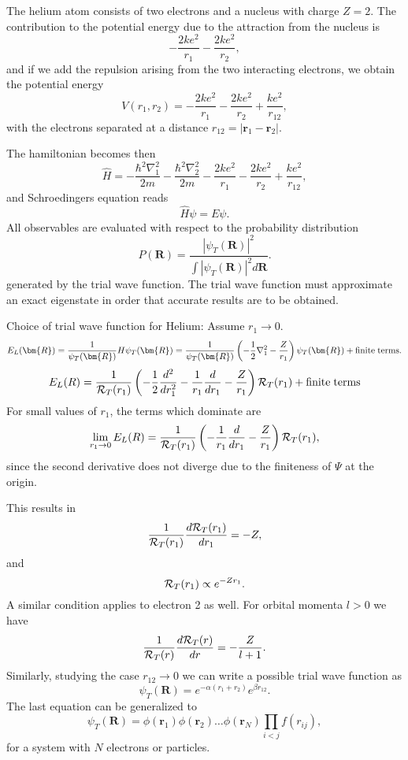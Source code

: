 \documentclass[graybox,sectrefs,envcountresetchap,open=right]{svmonodo}
\begin{document}
The helium atom consists of two electrons and a nucleus with
charge $Z=2$. 
The contribution  
to the potential energy due to the attraction from the nucleus is
\[
   -\frac{2ke^2}{r_1}-\frac{2ke^2}{r_2},
\] 
and if we add the repulsion arising from the two 
interacting electrons, we obtain the potential energy
\[
 V(r_1, r_2)=-\frac{2ke^2}{r_1}-\frac{2ke^2}{r_2}+
               \frac{ke^2}{r_{12}},
\]
with the electrons separated at a distance 
$r_{12}=|\bm{r}_1-\bm{r}_2|$.






The hamiltonian becomes then
\[
   \hat{H}=-\frac{\hbar^2\nabla_1^2}{2m}-\frac{\hbar^2\nabla_2^2}{2m}
          -\frac{2ke^2}{r_1}-\frac{2ke^2}{r_2}+
               \frac{ke^2}{r_{12}},
\]
and  Schroedingers equation reads
\[
   \hat{H}\psi=E\psi.
\]
All observables are evaluated with respect to the probability distribution
\[
   P(\bm{R})= \frac{\left|\psi_T(\bm{R})\right|^2}{\int \left|\psi_T(\bm{R})\right|^2d\bm{R}}.
\]
generated by the trial wave function.   
The trial wave function must approximate an exact 
eigenstate in order that accurate results are to be obtained. 




Choice of trial wave function for Helium:
Assume $r_1 \rightarrow 0$.
\[
   E_L(\bm{R})=\frac{1}{\psi_T(\bm{R})}H\psi_T(\bm{R})=
     \frac{1}{\psi_T(\bm{R})}\left(-\frac{1}{2}\nabla^2_1
     -\frac{Z}{r_1}\right)\psi_T(\bm{R}) + \mathrm{finite \hspace{0.1cm}terms}.
\]
\[ 
    E_L(R)=
    \frac{1}{{\cal R}_T(r_1)}\left(-\frac{1}{2}\frac{d^2}{dr_1^2}-
     \frac{1}{r_1}\frac{d}{dr_1}
     -\frac{Z}{r_1}\right){\cal R}_T(r_1) + \mathrm{finite\hspace{0.1cm} terms}
\]
For small values of $r_1$, the terms which dominate are
\[ 
    \lim_{r_1 \rightarrow 0}E_L(R)=
    \frac{1}{{\cal R}_T(r_1)}\left(-
     \frac{1}{r_1}\frac{d}{dr_1}
     -\frac{Z}{r_1}\right){\cal R}_T(r_1),
\]
since the second derivative does not diverge due to the finiteness of  $\Psi$ at the origin.







This results in
\[
     \frac{1}{{\cal R}_T(r_1)}\frac{d {\cal R}_T(r_1)}{dr_1}=-Z,
\]
and
\[
   {\cal R}_T(r_1)\propto e^{-Zr_1}.
\]
A similar condition applies to electron 2 as well. 
For orbital momenta $l > 0$ we have 
\[
     \frac{1}{{\cal R}_T(r)}\frac{d {\cal R}_T(r)}{dr}=-\frac{Z}{l+1}.
\]
Similarly, studying the case $r_{12}\rightarrow 0$ we can write 
a possible trial wave function as
\[
   \psi_T(\bm{R})=e^{-\alpha(r_1+r_2)}e^{\beta r_{12}}.
    \label{eq:wavehelium2}
\]
The last equation can be generalized to
\[
   \psi_T(\bm{R})=\phi(\bm{r}_1)\phi(\bm{r}_2)\dots\phi(\bm{r}_N)
                   \prod_{i < j}f(r_{ij}),
\]
for a system with $N$ electrons or particles. 
\end{document}

